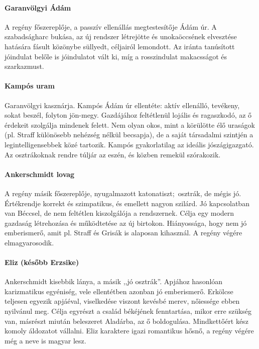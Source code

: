 \documentclass{thesis-ekf}
\theoremstyle{definition}
\begin{document}
    \paragraph{Garanvölgyi Ádám}
    A regény főszereplője, a passzív ellenállás megtestesítője Ádám úr.
    A szabadságharc bukása, az új rendszer létrejötte és unokaöccsének elvesztése hatására fásult közönybe süllyedt,
        céljairól lemondott.
    Az iránta tanúsított jóindulat belőle is jóindulatot vált ki, míg a rosszindulat makacsságot és szarkazmust.

    \paragraph{Kampós uram}
    Garanvölgyi kasznárja.
    Kampós Ádám úr ellentéte: aktív ellenálló, tevékeny, sokat beszél, folyton jön-megy.
    Gazdájához feltétlenül lojális és ragaszkodó, az ő érdekeit szolgálja mindenek felett.
    Nem olyan okos, mint a körülötte élő uraságok (pl.
    Straff különösebb nehézség nélkül becsapja), de a saját társadalmi szintjén a legintelligensebbek közé tartozik.
    Kampós gyakorlatilag az ideális jószágigazgató.
    Az osztrákoknak rendre túljár az eszén, és közben remekül szórakozik.

    \paragraph{Ankerschmidt lovag}
    A regény másik főszereplője, nyugalmazott katonatiszt;~osztrák, de mégis jó.
    Értékrendje korrekt és szimpatikus, és emellett nagyon szilárd.
    Jó kapcsolatban van Béccsel, de nem feltétlen kiszolgálója a rendszernek.
    Célja egy modern gazdaság létrehozása és működtetése az új birtokon.
    Hiányossága, hogy nem jó emberismerő, amit pl.
    Straff és Grisák is alaposan kihasznál.
    A regény végére elmagyarosodik.

    \paragraph{Eliz (később Erzsike)}
    Ankerschmidt kisebbik lánya, a másik ,,jó osztrák''.
    Apjához hasonlóan karizmatikus egyéniség, vele ellentétben azonban jó emberismerő.
    Erkölcse teljesen egyezik apjáéval, viselkedése viszont kevésbé merev, nőiessége ebben nyilvánul meg.
    Célja egyrészt a család békéjének fenntartása, mikor erre szükség van, másrészt miután beleszeret Aladárba, az ő boldogulása.
    Mindkettőért kész komoly áldozatot vállalni.
    Eliz karaktere igazi romantikus hősnő, a regény végére még a neve is magyar lesz.
\end{document}

